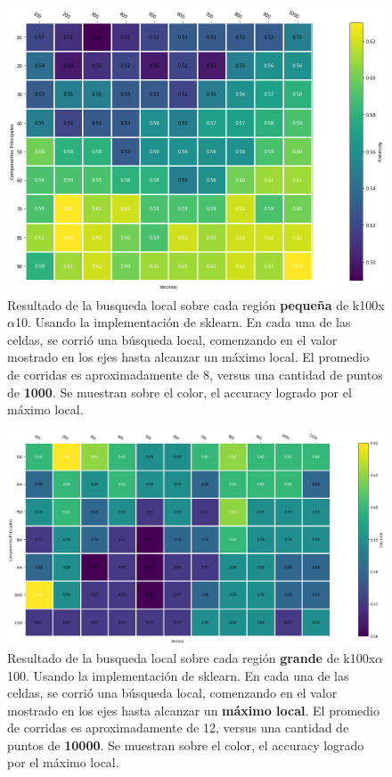\begin{figure}[h]
  \includegraphics[width=\textwidth]{./img/parameters-search-small.png}
  \centering
  \caption{Resultado de la busqueda local sobre cada región
    \textbf{pequeña} de k100x$\alpha$10. Usando la implementación de
    sklearn. En cada una de las celdas, se corrió una búsqueda local,
    comenzando en el valor mostrado en los ejes hasta alcanzar un
    máximo local. El promedio de corridas es aproximadamente de 8,
    versus una cantidad de puntos de \textbf{1000}. Se muestran sobre
    el color, el accuracy logrado por el máximo local.}
  \label{fig:param-small}
\end{figure}

\begin{figure}[h]
  \includegraphics[width=\textwidth]{./img/parameters-search-big.png}
  \centering
  \caption{Resultado de la busqueda local sobre cada región
    \textbf{grande} de k100x$\alpha$100. Usando la
    implementación de sklearn. En cada una de las celdas, se corrió
    una búsqueda local, comenzando en el valor mostrado en los ejes
    hasta alcanzar un \textbf{máximo local}. El promedio de corridas
    es aproximadamente de 12, versus una cantidad de puntos de
    \textbf{10000}. Se muestran sobre el color, el accuracy logrado
    por el máximo local.}
    \label{fig:param-big}
\end{figure}

